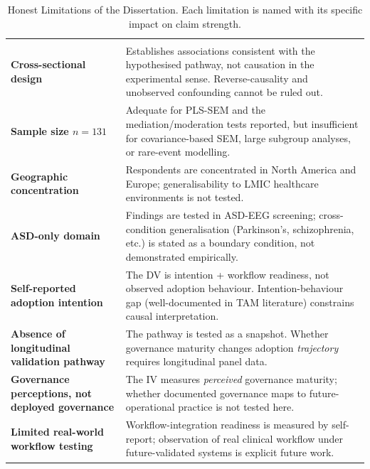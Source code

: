 {\tablestripes\tablefontsize
\begin{xltabular}{\textwidth}{@{} >{\raggedright\arraybackslash}p{3.2cm} L @{}}
\caption[Honest Limitations]{Honest Limitations of the Dissertation. Each limitation is named with its specific impact on claim strength.}\label{tab:ch5_limitations} \\
\toprule
{} &  \\
\midrule
\endfirsthead
\toprule
{} &  \\
\midrule
\endhead
\bottomrule
\endlastfoot
\textbf{Cross-sectional design}              & Establishes associations consistent with the hypothesised pathway, not causation in the experimental sense. Reverse-causality and unobserved confounding cannot be ruled out. \\
\textbf{Sample size $n=131$}                 & Adequate for PLS-SEM and the mediation/moderation tests reported, but insufficient for covariance-based SEM, large subgroup analyses, or rare-event modelling. \\
\textbf{Geographic concentration}            & Respondents are concentrated in North America and Europe; generalisability to LMIC healthcare environments is not tested. \\
\textbf{ASD-only domain}                     & Findings are tested in ASD-EEG screening; cross-condition generalisation (Parkinson's, schizophrenia, etc.) is stated as a boundary condition, not demonstrated empirically. \\
\textbf{Self-reported adoption intention}    & The DV is intention + workflow readiness, not observed adoption behaviour. Intention-behaviour gap (well-documented in TAM literature) constrains causal interpretation. \\
\textbf{Absence of longitudinal validation pathway} & The pathway is tested as a snapshot. Whether governance maturity changes adoption \emph{trajectory} requires longitudinal panel data. \\
\textbf{Governance perceptions, not deployed governance} & The IV measures \emph{perceived} governance maturity; whether documented governance maps to future-operational practice is not tested here. \\
\textbf{Limited real-world workflow testing} & Workflow-integration readiness is measured by self-report; observation of real clinical workflow under future-validated systems is explicit future work. \\

\end{xltabular}}

